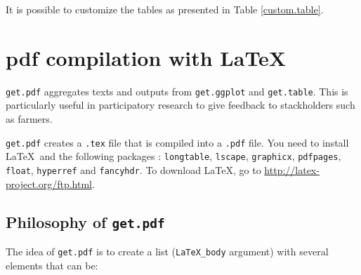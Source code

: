 \documentclass{article}\usepackage[]{graphicx}\usepackage[]{color}
\renewcommand{\sl}{seed-lots}
\begin{document}
It is possible to customize the tables as presented in Table \ref{custom.table}.








\newpage


\section{pdf compilation with \LaTeX}
\label{pdf}

\texttt{get.pdf} aggregates texts and outputs from \texttt{get.ggplot} and \texttt{get.table}.
This is particularly useful in participatory research to give feedback to stackholders such as farmers.

\texttt{get.pdf} creates a \texttt{.tex} file that is compiled into a \texttt{.pdf} file.
You need to install \LaTeX~and the following packages : \texttt{longtable}, \texttt{lscape}, \texttt{graphicx}, \texttt{pdfpages}, \texttt{float}, \texttt{hyperref} and \texttt{fancyhdr}. 
To download LaTeX, go to \url{http://latex-project.org/ftp.html}.


\subsection{Philosophy of \texttt{get.pdf} }

The idea of \texttt{get.pdf} is to create a list (\texttt{LaTeX\_body} argument) with several elements that can be:
\end{document}

